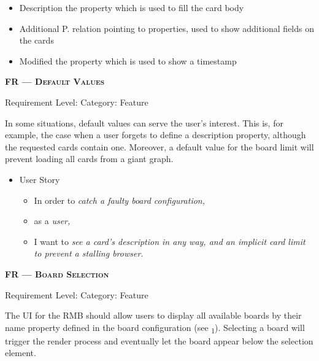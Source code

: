 \begin{itemize}[after=\vspace{1em}]
\begin{itemize}
\begin{itemize}[before=\vspace*{-.5em}]
        \setlength\itemsep{-0.5em}
        \item \small{Description \tabto*{20.8mm} the property which is used to fill the card body}
        \item \small{Additional P. \tabto*{20.8mm} relation pointing to properties, used to show additional fields on the cards}
        \item \small{Modified \tabto*{20.8mm} the property which is used to show a timestamp}
        \end{itemize}
    \end{itemize}
\end{itemize}




\centerline{\textbf{FR\textsubscript{} --- \textsc{Default Values}}}
\centerline{\small Requirement Level:  \quad{} Category: Feature}

\noindent In some situations, default values can serve the user’s interest. This is, for example, the case when a user forgets to define a description property, although the requested cards contain one. Moreover, a default value for the board limit will prevent loading all cards from a giant graph.


\begin{itemize}[after=\vspace{1em}]
    \setlength\itemsep{-0.5em}
	\item[] User Story\\[-7.8mm]
	\begin{itemize}
    \setlength\itemsep{-0.5em}
        \item[] In order to \textit{catch a faulty board configuration,}
        \item[] as a \textit{user,}
        \item[] I want to \textit{see a card’s description in any way, and an implicit card limit to prevent a stalling browser.}
    \end{itemize}
\end{itemize}






\centerline{\textbf{FR\textsubscript{} --- \textsc{Board Selection}}}
\centerline{\small Requirement Level:  \quad{} Category: Feature}

\noindent The \acrshort*{UI} for the \acrshort*{RMB} should allow users to display all available boards by their name property defined in the board configuration (see \textsubscript{1}). Selecting a board will trigger the render process and eventually let the board appear below the selection element.

